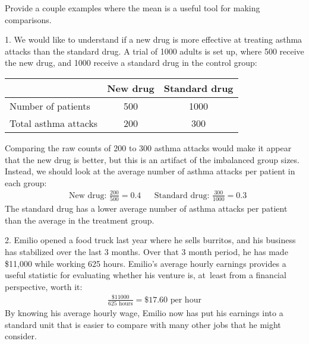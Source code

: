 \begin{examplewrap}
\begin{nexample}{Provide a couple examples where the mean
    is a useful tool for making comparisons.}

  1. We would like to understand if a new drug is more
  effective at treating asthma attacks than the standard drug.
  A trial of 1000 adults is set up, where 500 receive the new
  drug, and 1000 receive a standard drug in the control
  group:\vspace{-2mm}
  \begin{center}
  \begin{tabular}{l cc}
  &           New drug & Standard drug \\
  \hline
  Number of patients   & 500 & 1000 \\
  Total asthma attacks & 200 & 300 \\
  \hline
  \end{tabular}
  \end{center}
  Comparing the raw counts of 200 to 300 asthma attacks
  would make it appear that the new drug is better,
  but this is an artifact of the imbalanced group sizes.
  Instead, we should look at the average number of asthma
  attacks per patient in each group:
  \begin{align*}
  & \text{New drug: } \frac{200}{500} = 0.4 %
  && \text{Standard drug: }\frac{300}{1000} = 0.3
  \end{align*}
  The standard drug has a lower average number of asthma
  attacks per patient than the average in the treatment group.

  2. Emilio opened a food truck last year where he sells burritos,
  and his business has stabilized over the last 3 months.
  Over that 3 month period, he has made \$11,000 while
  working 625 hours.
  Emilio's average hourly earnings provides
  a useful statistic for evaluating whether his venture is,
  at~least from a financial perspective, worth it:
  \begin{align*}
  \frac{\$11000}{625\text{ hours}} = \$17.60\text{ per hour}
  \end{align*}
  By knowing his average hourly wage,
  Emilio now has put his earnings into a standard unit that
  is easier to compare with many other jobs that he might
  consider.
\end{nexample}
\end{examplewrap}

